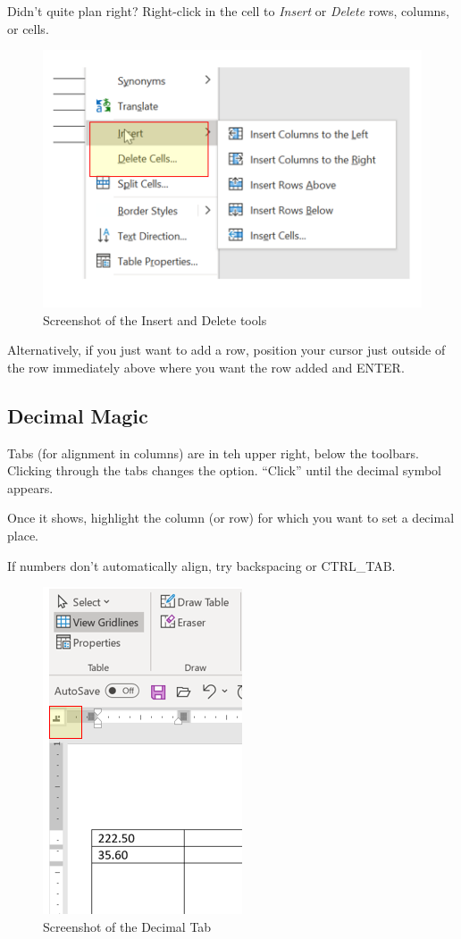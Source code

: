 \documentclass[
  english,
]{book}
\begin{document}
Didn't quite plan right? Right-click in the cell to \emph{Insert} or \emph{Delete} rows, columns, or cells.

\begin{figure}
\centering
\includegraphics{images/TableMagic/InsertDelete.png}
\caption{Screenshot of the Insert and Delete tools}
\end{figure}

Alternatively, if you just want to add a row, position your cursor just outside of the row immediately above where you want the row added and ENTER.

\hypertarget{decimal-magic}{%
\subsection{Decimal Magic}\label{decimal-magic}}

Tabs (for alignment in columns) are in teh upper right, below the toolbars. Clicking through the tabs changes the option. ``Click'' until the decimal symbol appears.

Once it shows, highlight the column (or row) for which you want to set a decimal place.

If numbers don't automatically align, try backspacing or CTRL\_TAB.

\begin{figure}
\centering
\includegraphics{images/TableMagic/DecimalTab.png}
\caption{Screenshot of the Decimal Tab}
\end{figure}
\end{document}
